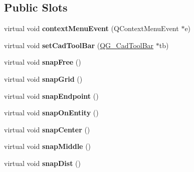 \subsection*{Public Slots}
\begin{DoxyCompactItemize}
\item 
\hypertarget{classQG__CadToolBarSnap_a7462923a27a6f7fe386255b60ad81a8c}{virtual void {\bfseries context\-Menu\-Event} (Q\-Context\-Menu\-Event $\ast$e)}\label{classQG__CadToolBarSnap_a7462923a27a6f7fe386255b60ad81a8c}

\item 
\hypertarget{classQG__CadToolBarSnap_a47e6d79b68375d7838da07362ced1f01}{virtual void {\bfseries set\-Cad\-Tool\-Bar} (\hyperlink{classQG__CadToolBar}{Q\-G\-\_\-\-Cad\-Tool\-Bar} $\ast$tb)}\label{classQG__CadToolBarSnap_a47e6d79b68375d7838da07362ced1f01}

\item 
\hypertarget{classQG__CadToolBarSnap_a89c06608095df2b4a601ebd62bc13aab}{virtual void {\bfseries snap\-Free} ()}\label{classQG__CadToolBarSnap_a89c06608095df2b4a601ebd62bc13aab}

\item 
\hypertarget{classQG__CadToolBarSnap_a87c37522224c70f94f33d02ed0168d7d}{virtual void {\bfseries snap\-Grid} ()}\label{classQG__CadToolBarSnap_a87c37522224c70f94f33d02ed0168d7d}

\item 
\hypertarget{classQG__CadToolBarSnap_a7193ea78052e19983efc307f7b6d5725}{virtual void {\bfseries snap\-Endpoint} ()}\label{classQG__CadToolBarSnap_a7193ea78052e19983efc307f7b6d5725}

\item 
\hypertarget{classQG__CadToolBarSnap_a8f1f925625a1f93a16bad299d64e5262}{virtual void {\bfseries snap\-On\-Entity} ()}\label{classQG__CadToolBarSnap_a8f1f925625a1f93a16bad299d64e5262}

\item 
\hypertarget{classQG__CadToolBarSnap_a2e85c3c893ef863f20a6fc3e86b94324}{virtual void {\bfseries snap\-Center} ()}\label{classQG__CadToolBarSnap_a2e85c3c893ef863f20a6fc3e86b94324}

\item 
\hypertarget{classQG__CadToolBarSnap_ab4c47ac485225d63a99378d436daa45c}{virtual void {\bfseries snap\-Middle} ()}\label{classQG__CadToolBarSnap_ab4c47ac485225d63a99378d436daa45c}

\item 
\hypertarget{classQG__CadToolBarSnap_a746066cbd2108d07f78d9f74d17aab8f}{virtual void {\bfseries snap\-Dist} ()}\label{classQG__CadToolBarSnap_a746066cbd2108d07f78d9f74d17aab8f}


\end{DoxyCompactItemize}
